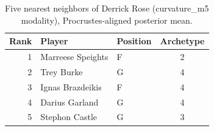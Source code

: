 \begin{table}[htbp]
  \centering\small
  \begin{tabular}{rllc}
    \toprule
    Rank & Player & Position & Archetype \\
    \midrule
    1 & Marreese Speights & F & 2 \\
    2 & Trey Burke & G & 4 \\
    3 & Ignas Brazdeikis & F & 4 \\
    4 & Darius Garland & G & 4 \\
    5 & Stephon Castle & G & 3 \\
    \bottomrule
  \end{tabular}
  \caption{Five nearest neighbors of Derrick Rose (curvature_m5 modality), Procrustes-aligned posterior mean.}
  \label{tab:Derrick_Rose_neighbors_curvature_m5}
\end{table}

